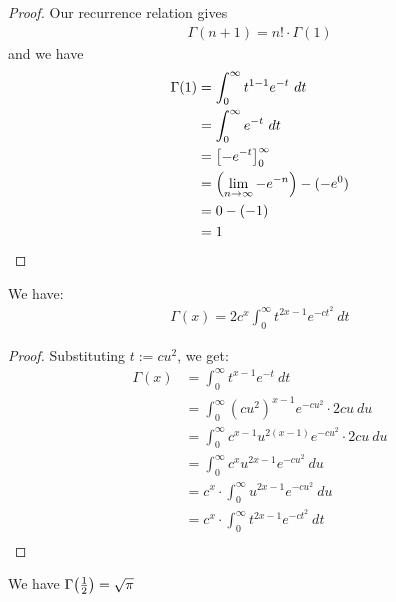 \begin{proof}
	Our recurrence relation gives
	\begin{align*}
		\Gamma(n + 1) = n! \cdot \Gamma(1)
	\end{align*}
	and we have
	\begin{align*}
		\Gamma(1) 
		&=
		\int_0^\infty t^{1-1}e^{-t} ~dt\\
		&=
		\int_0^\infty e^{-t} ~dt\\
		&=
		\qty[-e^{-t}]_0^\infty\\
		&= \qty(\lim_{n \to \infty} -e^{-n}) - (-e^0)\\
		&= 0 - (-1)\\
		&= 1
	\end{align*}
\end{proof}
\begin{lemma}
	We have:
	\begin{align*}
		\Gamma(x) = 2c^x \int_0^\infty t^{2x-1} e^{-ct^2} ~dt
	\end{align*}
\end{lemma}
\begin{proof}
	Substituting $t := cu^2$, we get:
	\begin{align*}
		\Gamma(x) &=
		\int_{0}^\infty t^{x - 1} e^{-t} ~dt\\
		&= \int_{0}^\infty (cu^2)^{x - 1} e^{-cu^2} \cdot 2cu ~du\\
		&= \int_0^\infty c^{x-1} u^{2(x-1)} e^{-cu^2} \cdot 2cu ~du\\
		&= \int_0^\infty c^x u^{2x-1} e^{-cu^2} ~du\\
		&= c^x \cdot \int_0^\infty u^{2x-1} e^{-cu^2} ~du\\
		&= c^x \cdot \int_0^\infty t^{2x-1} e^{-ct^2} ~dt\\
	\end{align*}
\end{proof}
\begin{proposition}
	We have $\Gamma\qty(\frac{1}{2}) = \sqrt{\pi}$
\end{proposition}
